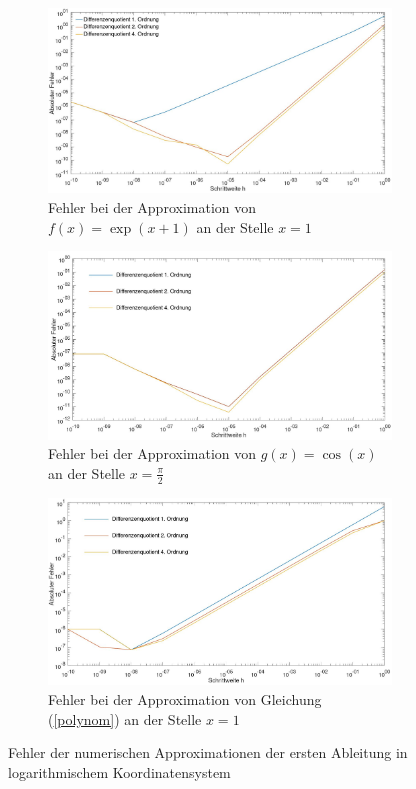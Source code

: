 \begin{figure}[thbp]
	\centering
	\begin{subfigure}[tpbh]{0.68\textwidth}
		\centering
		\includegraphics[width=\textwidth]{data/eFunktion}
		\caption{Fehler bei der Approximation von $f(x) = \exp(x+1)$ an der Stelle $x=1$}
		\label{fig:eFunktion}
	\end{subfigure}
	\begin{subfigure}[tpbh]{0.68\textwidth}
		\centering
		\includegraphics[width=\textwidth]{data/sinus}
		\caption{Fehler bei der Approximation von $g(x) = \cos(x)$ an der Stelle $x=\frac{\pi}{2}$}
		\label{fig:cosinus}
	\end{subfigure}
	\begin{subfigure}[tpbh]{0.68\textwidth}
		\centering
		\includegraphics[width=\textwidth]{data/abschnittsFkt}
		\caption{Fehler bei der Approximation von Gleichung (\ref{polynom}) an der Stelle $x=1$ }
		\label{fig:Polynom}
	\end{subfigure}
	\caption{Fehler der numerischen Approximationen der ersten Ableitung in logarithmischem Koordinatensystem}
	\label{fig:fehlerPlots}
\end{figure}



